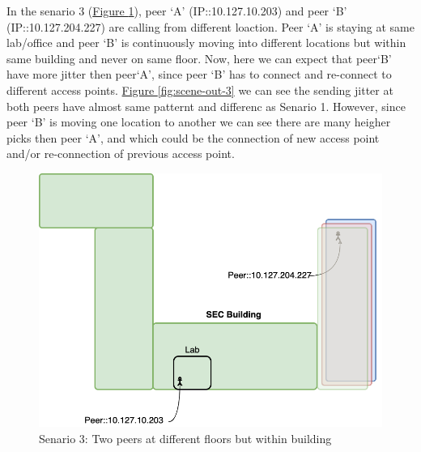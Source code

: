 	In the senario 3 (\hyperref[fig:scene-3]{Figure \ref{fig:scene-3}}), peer `A' (IP::10.127.10.203) and peer `B' (IP::10.127.204.227) are calling from different loaction. Peer `A' is staying at same lab/office and peer `B' is continuously moving into different locations but within same building and never on same floor. Now, here we can expect that peer`B' have more jitter then peer`A', since peer `B' has to connect and re-connect to different access points. \hyperref[fig:scene-out-3]{Figure \ref{fig:scene-out-3}} we can see the sending jitter at both peers have almost same patternt and differenc as Senario 1. However, since peer `B' is moving one location to another we can see there are many heigher picks then peer `A', and which could be the connection of new access point and/or re-connection of previous access point.
	\begin{figure}[thb]
		\begin{minipage}{\textwidth}
			\includegraphics[scale=0.29]{Images/experiment/senarios/diff_floor.drawio.png}
		\end{minipage}
		\caption{Senario 3: Two peers at different floors but within building}
		\label{fig:scene-3}
	\end{figure}

